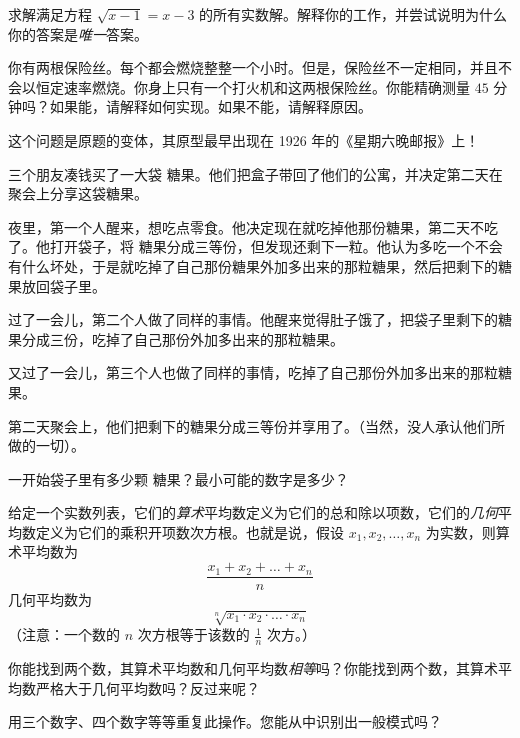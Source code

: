 \begin{exercise}
    求解满足方程 $\sqrt{x - 1} = x - 3$ 的所有实数解。解释你的工作，并尝试说明为什么你的答案是\emph{唯一}答案。
\end{exercise}

\begin{exercise}
    你有两根保险丝。每个都会燃烧整整一个小时。但是，保险丝不一定相同，并且不会以恒定速率燃烧。你身上只有一个打火机和这两根保险丝。你能精确测量 $45$ 分钟吗？如果能，请解释如何实现。如果不能，请解释原因。
\end{exercise}

\begin{exercise}
    这个问题是原题的变体，其原型最早出现在 1926 年的《星期六晚邮报》上！

    三个朋友凑钱买了一大袋  糖果。他们把盒子带回了他们的公寓，并决定第二天在聚会上分享这袋糖果。

    夜里，第一个人醒来，想吃点零食。他决定现在就吃掉他那份糖果，第二天不吃了。他打开袋子，将  糖果分成三等份，但发现还剩下一粒。他认为多吃一个不会有什么坏处，于是就吃掉了自己那份糖果外加多出来的那粒糖果，然后把剩下的糖果放回袋子里。

    过了一会儿，第二个人做了同样的事情。他醒来觉得肚子饿了，把袋子里剩下的糖果分成三份，吃掉了自己那份外加多出来的那粒糖果。

    又过了一会儿，第三个人也做了同样的事情，吃掉了自己那份外加多出来的那粒糖果。

    第二天聚会上，他们把剩下的糖果分成三等份并享用了。（当然，没人承认他们所做的一切）。

    一开始袋子里有多少颗  糖果？最小可能的数字是多少？
\end{exercise}

\begin{exercise}
    给定一个实数列表，它们的\emph{算术}平均数定义为它们的总和除以项数，它们的\emph{几何}平均数定义为它们的乘积开项数次方根。也就是说，假设 $x_1, x_2, \dots , x_n$ 为实数，则算术平均数为
    \[\frac{x_1+x_2+ \dots + x_n}{n}\]
    几何平均数为
    \[\sqrt[n]{x_1 \cdot x_2 \cdot \dots \cdot x_n}\]
    （注意：一个数的 $n$ 次方根等于该数的 $\frac{1}{n}$ 次方。）

    你能找到两个数，其算术平均数和几何平均数\emph{相等}吗？你能找到两个数，其算术平均数严格大于几何平均数吗？反过来呢？

    用三个数字、四个数字等等重复此操作。您能从中识别出一般模式吗？
\end{exercise}

